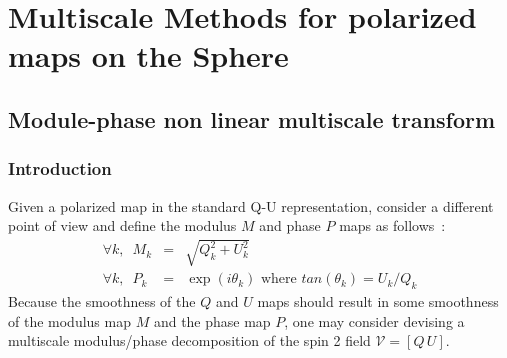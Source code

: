 \chapter{Multiscale Methods for polarized maps on the Sphere}
\label{ch_mms_pola}


\section{Module-phase non linear multiscale transform}
\label{sec:modphase}

\subsection{Introduction}
Given a polarized map in the standard Q-U representation, consider a different point of view and define the modulus $M$ and phase $P$ maps as follows~:
%
\begin{eqnarray}
\forall k,\,\,\, M_k & = & \sqrt{Q_k^2 +  U_k^2} \\
\forall k,\,\,\, P_k & = & \exp(i \theta_k) \mbox{ where } tan(\theta_k) = U_k/Q_k 
\end{eqnarray}
Because the smoothness of the $Q$ and $U$ maps should result in some smoothness of the modulus map $M$ and the phase map $P$, 
one may consider devising a multiscale modulus/phase decomposition of the spin 2 field ${\mathcal{V}} = \left[ Q \, U\right]$.\\

